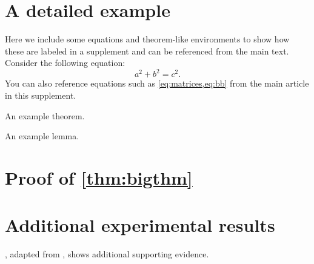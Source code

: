 \documentclass[review,supplement]{siamart}
\begin{document}
\thispagestyle{plain}
\TitleAndAuthorCommands
\maketitle

\section{A detailed example}

Here we include some equations and theorem-like environments to show
how these are labeled in a supplement and can be referenced from the
main text.
Consider the following equation:
\begin{equation}
  \label{eq:suppa}
  a^2 + b^2 = c^2.
\end{equation}
You can also reference equations such as \cref{eq:matrices,eq:bb} 
from the main article in this supplement.

\lipsum[100-101]

\begin{theorem}
  An example theorem.
\end{theorem}

\lipsum[102]
 
\begin{lemma}
  An example lemma.
\end{lemma}

\lipsum[103-105]

\section{Proof of \cref{thm:bigthm}}
\label{sec:proof}

\lipsum[106-115]

\section{Additional experimental results}
, adapted from \cite{KoMa14}, shows additional
supporting evidence.
\end{document}
